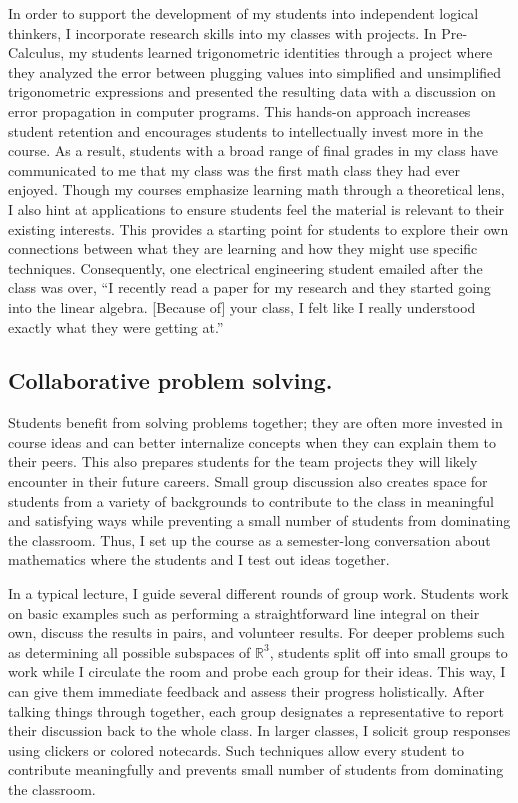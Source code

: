 \documentclass[11pt]{amsart}
\theoremstyle{plain}
\theoremstyle{definition}
\theoremstyle{remark}
\begin{document}
In order to support the development of my students into independent logical thinkers, I incorporate research skills into my classes with projects. In Pre-Calculus, my students learned trigonometric identities through a project where they analyzed the error between plugging values into simplified and unsimplified trigonometric expressions and presented the resulting data with a discussion on error propagation in computer programs. This hands-on approach increases student retention and encourages students to intellectually invest more in the course. As a result, students with a broad range of final grades in my class have communicated to me that my class was the first math class they had ever enjoyed. Though my courses emphasize learning math through a theoretical lens, I also hint at applications to ensure students feel the material is relevant to their existing interests. This provides a starting point for students to explore their own connections between what they are learning and how they might use specific techniques.  Consequently, one electrical engineering student emailed after the class was over, ``I recently read a paper for my research and they started going into the linear algebra. [Because of] your class, I felt like I really understood exactly what they were getting at.''


 \subsection*{Collaborative problem solving.} Students benefit from solving problems together; they are often more invested in course ideas and can better internalize concepts when they can explain them to their peers. This also prepares students for the team projects they will likely encounter in their future careers. Small group discussion also creates space for students from a variety of backgrounds to contribute to the class in meaningful and satisfying ways while preventing a small number of students from dominating the classroom.  Thus, I set up the course as a semester-long conversation about mathematics where the students and I test out ideas together.
 
In a typical lecture, I guide several different rounds of group work. Students work on basic examples such as performing a straightforward line integral on their own, discuss the results in pairs, and volunteer results. For deeper problems such as determining all possible subspaces of $\mathbb{R}^3$, students split off into small groups to work while I circulate the room and probe each group for their ideas. This way, I can give them immediate feedback and assess their progress holistically.  After talking things through together, each group designates a representative to report their discussion back to the whole class. In larger classes, I solicit group responses using clickers or colored notecards. Such techniques allow every student to contribute meaningfully and prevents small number of students from dominating the classroom. 
  
\end{document}
